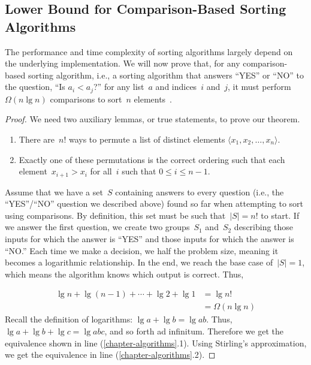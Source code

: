 \subsection{Lower Bound for Comparison-Based Sorting Algorithms}
The performance and time complexity of sorting algorithms largely depend on the underlying implementation. 
We will now prove that, for any comparison-based sorting algorithm, i.e., a sorting algorithm that answers ``YES'' or ``NO'' to the question, ``Is $a_i < a_j$?'' for any list~$a$ and indices~$i$ and~$j$, it must perform~$\Omega(n \lg n)$ comparisons to sort~$n$ elements~.

\begin{proof}
We need two auxiliary lemmas, or true statements, to prove our theorem.
\begin{enumerate}[label=(\alph*)]
  \item There are~$n!$ ways to permute a list of distinct elements $\langle{x_1, x_2, \ldots, x_n}\rangle$. 
  \item Exactly one of these permutations is the correct ordering such that each element~$x_{i+1} > x_{i}$ for all~$i$ such that $0 \leq i \leq n-1$. 
\end{enumerate}

Assume that we have a set~$S$ containing answers to every question (i.e., the ``YES''/``NO'' question we described above) found so far when attempting to sort using comparisons. 
By definition, this set must be such that~$|S|=n!$ to start. 
If we answer the first question, we create two groups~$S_1$ and~$S_2$ describing those inputs for which the answer is ``YES'' and those inputs for which the answer is ``NO.'' 
Each time we make a decision, we half the problem size, meaning it becomes a logarithmic relationship. 
In the end, we reach the base case of~$|S|=1$, which means the algorithm knows which output is correct. Thus,

\begin{align}
\lg{n} + \lg{(n-1)} + \cdots + \lg{2} + \lg{1} &= \lg{n!}\\
        &= \Omega(n \lg n)
\end{align}
Recall the definition of logarithms: $\lg{a} + \lg{b} = \lg{ab}$. 
Thus, $\lg{a} + \lg{b} + \lg{c} = \lg{abc}$, and so forth ad infinitum. 
Therefore we get the equivalence shown in line (\ref{chapter-algorithms}.1). 
Using Stirling's approximation, we get the equivalence in line (\ref{chapter-algorithms}.2).
\end{proof}
